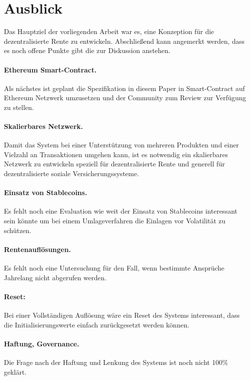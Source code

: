 \section{Ausblick}


Das Hauptziel der vorliegenden Arbeit war es, eine Konzeption für die dezentralisierte Rente zu entwickeln. Abschließend kann angemerkt werden, dass es noch offene Punkte gibt die zur Diskussion anstehen.


\paragraph{Ethereum Smart-Contract.} Als nächstes ist geplant die Spezifikation in diesem Paper in Smart-Contract auf Ethereum Netzwerk umzusetzen und der Community zum Review zur Verfügung zu stellen.

\paragraph{Skalierbares Netzwerk.} Damit das System bei einer Unterstützung von mehreren Produkten und einer Vielzahl an Transaktionen umgehen kann, ist es notwendig ein skalierbares Netzwerk zu entwickeln speziell für dezentralisierte Rente und generell für dezentralisierte soziale Versicherungssysteme.

\paragraph{Einsatz von Stablecoins.} Es fehlt noch eine Evaluation wie weit der Einsatz von Stablecoins interessant sein könnte um bei einem Umlageverfahren die Einlagen vor Volatilität zu schützen.

\paragraph{Rentenauflösungen.} Es fehlt noch eine Untersuchung für den Fall, wenn bestimmte Ansprüche Jahrelang nicht abgerufen werden.

\paragraph{Reset:} Bei einer Vollständigen Auflösung wäre ein Reset des Systems interessant, dass die Initialisierungswerte einfach zurückgesetzt werden können.

\paragraph{Haftung, Governance.} Die Frage nach der Haftung und Lenkung des Systems ist noch nicht 100\% geklärt.

